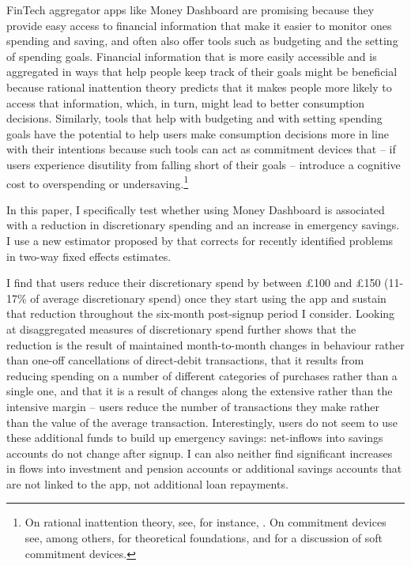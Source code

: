 FinTech aggregator apps like Money Dashboard are promising because they provide
easy access to financial information that make it easier to monitor ones
spending and saving, and often also offer tools such as budgeting and the
setting of spending goals. Financial information that
is more easily accessible and is aggregated in ways that help people keep track
of their goals might be beneficial because rational inattention theory predicts
that it makes people more likely to access that information, which, in turn,
might lead to better consumption decisions. Similarly, tools that help with
budgeting and with setting spending goals have the potential to help users make
consumption decisions more in line with their intentions because such tools can
act as commitment devices that -- if users experience disutility from falling
short of their goals -- introduce a cognitive cost to overspending or
undersaving.\footnote{On rational inattention theory, see, for instance,
    \citet{brunnermeier2008wealth, dellavigna2009psychology,
    sims2003implications}. On commitment devices see, among others,
    \citet{thaler1981economic, laibson1997golden, o1999doing} for theoretical
    foundations, and \citet{beshears2016beyond, hsiaw2013goal} for a discussion
of soft commitment devices.}

In this paper, I specifically test whether using Money Dashboard is associated
with a reduction in discretionary spending and an increase in emergency
savings. I use a new estimator proposed by \citet{callaway2021difference} that
corrects for recently identified problems in two-way fixed effects estimates.

I find that users reduce their discretionary spend by between \pounds100 and
\pounds150 (11-17\% of average discretionary spend) once they start using the
app and sustain that reduction throughout the six-month post-signup period I
consider. Looking at disaggregated measures of discretionary spend further
shows that the reduction is the result of maintained month-to-month changes in
behaviour rather than one-off cancellations of direct-debit transactions, that
it results from reducing spending on a number of different categories of
purchases rather than a single one, and that it is a result of changes along
the extensive rather than the intensive margin -- users reduce the number of
transactions they make rather than the value of the average transaction.
Interestingly, users do not seem to use these additional funds to build up
emergency savings: net-inflows into savings accounts do not change after
signup. I can also neither find significant increases in flows into investment
and pension accounts or additional savings accounts that are not linked to the
app, not additional loan repayments.

